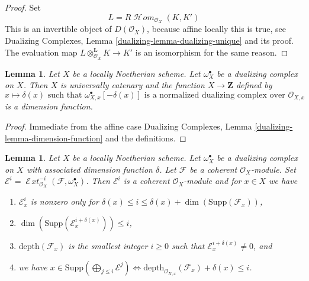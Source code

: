 \documentclass{stacks-project}
\theoremstyle{plain}
\newtheorem{lemma}[subsection]{Lemma}
\theoremstyle{definition}
\theoremstyle{remark}
\numberwithin{equation}{subsection}
\def\SheafHom{\mathop{\mathcal{H}\!\mathit{om}}\nolimits}
\def\SheafExt{\mathop{\mathcal{E}\!\mathit{xt}}\nolimits}
\begin{document}
\begin{proof}
Set
$$
L = R\SheafHom_{\mathcal{O}_X}(K, K')
$$
This is an invertible object of $D(\mathcal{O}_X)$, because affine locally
this is true, see Dualizing Complexes, Lemma
\ref{dualizing-lemma-dualizing-unique} and its proof.
The evaluation map $L \otimes_{\mathcal{O}_X}^\mathbf{L} K \to K'$
is an isomorphism for the same reason.
\end{proof}

\begin{lemma}
\label{lemma-dimension-function-scheme}
Let $X$ be a locally Noetherian scheme. Let $\omega_X^\bullet$
be a dualizing complex on $X$. Then $X$ is universally catenary
and the function
$X \to \mathbf{Z}$ defined by
$$
x \longmapsto \delta(x)\text{ such that }
\omega_{X, x}^\bullet[-\delta(x)]
\text{ is a normalized dualizing complex over }
\mathcal{O}_{X, x}
$$
is a dimension function.
\end{lemma}

\begin{proof}
Immediate from the affine case
Dualizing Complexes, Lemma \ref{dualizing-lemma-dimension-function}
and the definitions.
\end{proof}

\begin{lemma}
\label{lemma-sitting-in-degrees}
Let $X$ be a locally Noetherian scheme. Let $\omega_X^\bullet$
be a dualizing complex on $X$ with associated dimension function $\delta$.
Let $\mathcal{F}$ be a coherent $\mathcal{O}_X$-module. Set
$\mathcal{E}^i = \SheafExt^{-i}_{\mathcal{O}_X}(\mathcal{F}, \omega_X^\bullet)$.
Then $\mathcal{E}^i$ is a coherent $\mathcal{O}_X$-module and
for $x \in X$ we have
\begin{enumerate}
\item $\mathcal{E}^i_x$ is nonzero only for
$\delta(x) \leq i \leq \delta(x) + \dim(\text{Supp}(\mathcal{F}_x))$,
\item $\dim(\text{Supp}(\mathcal{E}^{i + \delta(x)}_x)) \leq i$,
\item $\text{depth}(\mathcal{F}_x)$ is the smallest integer
$i \geq 0$ such that $\mathcal{E}_x^{i + \delta(x)} \not = 0$, and
\item we have
$x \in \text{Supp}(\bigoplus_{j \leq i} \mathcal{E}^j)
\Leftrightarrow
\text{depth}_{\mathcal{O}_{X, x}}(\mathcal{F}_x) + \delta(x) \leq i$.
\end{enumerate}
\end{lemma}
\end{document}
